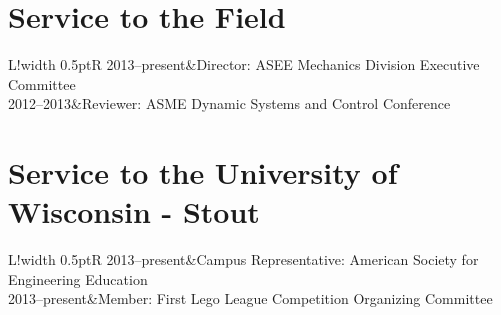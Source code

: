 \documentclass[10pt]{article}
\newcommand\VRule{\color{lightgray}\vrule width 0.5pt}
\begin{document}


\section*{Service to the Field}
\begin{tabular}{L!{\VRule}R}
2013--present&Director: ASEE Mechanics Division Executive Committee\\
2012--2013&Reviewer: ASME Dynamic Systems and Control Conference\\
\end{tabular}

\section*{Service to the University of Wisconsin - Stout}
\begin{tabular}{L!{\VRule}R}
2013--present&Campus Representative: American Society for Engineering Education\\
2013--present&Member: First Lego League Competition Organizing Committee\\
\end{tabular}

\end{document}
